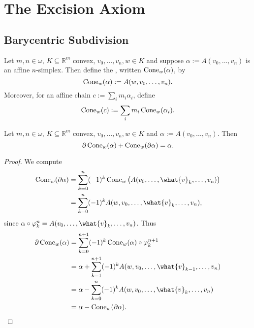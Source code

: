 \section*{The Excision Axiom}
\subsection*{Barycentric Subdivision}

\begin{definition}[Cone]
	Let $m,n \in \omega$, $K \subseteq \mathbb{R}^m$ convex, $v_0,\dots,v_n,w \in K$ and suppose $\alpha := A(v_0,\dots,v_n)$ is an affine $n$-simplex. Then define the , written $\operatorname{Cone}_w(\alpha)$, by
	\begin{equation*}
		\operatorname{Cone}_w(\alpha) := A(w,v_0,\dots,v_n).
	\end{equation*}
	Moreover, for an affine chain $c := \sum_{i}m_i \alpha_i$, define
	\begin{equation*}
		\operatorname{Cone}_w(c) := \sum_i m_i \operatorname{Cone}_w(\alpha_i).
	\end{equation*}
\end{definition}

\begin{lemma}
	\label{lem:partial_cone}
	Let $m,n \in \omega$, $K \subseteq \mathbb{R}^m$ convex, $v_0,\dots,v_n,w \in K$ and $\alpha := A(v_0,\dots,v_n)$. Then
	\begin{equation*}
		\partial \operatorname{Cone}_w(\alpha) + \operatorname{Cone}_w(\partial \alpha) = \alpha.
	\end{equation*}
\end{lemma}

\begin{proof}
	We compute
	\begin{align*}
		\Cone_w(\partial \alpha) &= \sum_{k = 0}^n (-1)^k \Cone_w\del[1]{A(v_0,\dots,\what{v}_k,\dots,v_n)}\\
		&= \sum_{k = 0}^n (-1)^kA(w,v_0,\dots,\what{v}_k,\dots,v_n),
	\end{align*}
	\noindent since $\alpha \circ \varphi_k^n = A(v_0,\dots,\what{v}_k,\dots,v_n)$. Thus
	\begin{align*}
		\partial \Cone_w(\alpha) &= \sum_{k = 0}^{n + 1} (-1)^k \Cone_w(\alpha) \circ \varphi_k^{n+1}\\
		&= \alpha + \sum_{k = 1}^{n + 1} (-1)^k A(w,v_0,\dots,\what{v}_{k - 1},\dots,v_n)\\
		&= \alpha - \sum_{k = 0}^n (-1)^k A(w,v_0,\dots,\what{v}_k,\dots,v_n)\\
		&= \alpha - \Cone_w(\partial \alpha).
	\end{align*}
\end{proof}

